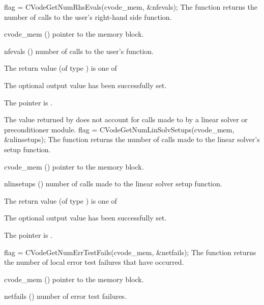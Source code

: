 {}
{
  flag = CVodeGetNumRhsEvals(cvode\_mem, \&nfevals);
}
{
  The function  returns the
  number of calls to the user's right-hand side function.
}
{
  \begin{args}
  \item[cvode\_mem] ()
    pointer to the {\cvode} memory block.
  \item[nfevals] ()
    number of calls to the user's  function.
  \end{args}
}
{
  The return value  (of type ) is one of
  \begin{args}
  \item[\Id{CV\_SUCCESS}]
    The optional output value has been successfully set.
  \item[\Id{CV\_MEM\_NULL}]
    The  pointer is .
  \end{args}
}
{
  The  value returned by  does not
  account for calls made to  by a linear solver or preconditioner
  module.
}
{
  flag = CVodeGetNumLinSolvSetups(cvode\_mem, \&nlinsetups);
}
{
  The function  returns the
  number of calls made to the linear solver's setup function.
}
{
  \begin{args}[nlinsetups]
  \item[cvode\_mem] ()
    pointer to the {\cvode} memory block.
  \item[nlinsetups] ()
    number of calls made to the linear solver setup function.
  \end{args}
}
{
  The return value  (of type ) is one of
  \begin{args}
  \item[\Id{CV\_SUCCESS}]
    The optional output value has been successfully set.
  \item[\Id{CV\_MEM\_NULL}]
    The  pointer is .
  \end{args}
}
{}
{
  flag = CVodeGetNumErrTestFails(cvode\_mem, \&netfails);
}
{
  The function  returns the
  number of local error test failures that have occurred.
}
{
  \begin{args}
  \item[cvode\_mem] ()
    pointer to the {\cvode} memory block.
  \item[netfails] ()
    number of error test failures.
  \end{args}
}
